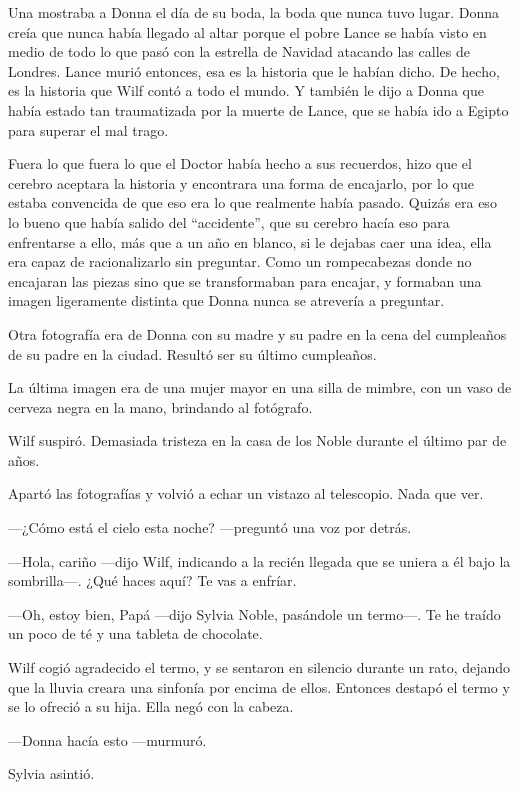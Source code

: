 Una mostraba a Donna el día de su boda, la boda que nunca tuvo lugar.
Donna creía que nunca había llegado al altar porque el pobre Lance se
había visto en medio de todo lo que pasó con la estrella de Navidad
atacando las calles de Londres. Lance murió entonces, esa es la historia
que le habían dicho. De hecho, es la historia que Wilf contó a todo el
mundo. Y también le dijo a Donna que había estado tan traumatizada por
la muerte de Lance, que se había ido a Egipto para superar el mal trago.

Fuera lo que fuera lo que el Doctor había hecho a sus recuerdos, hizo
que el cerebro aceptara la historia y encontrara una forma de encajarlo,
por lo que estaba convencida de que eso era lo que realmente había
pasado. Quizás era eso lo bueno que había salido del ``accidente'', que
su cerebro hacía eso para enfrentarse a ello, más que a un año en
blanco, si le dejabas caer una idea, ella era capaz de racionalizarlo
sin preguntar. Como un rompecabezas donde no encajaran las piezas sino
que se transformaban para encajar, y formaban una imagen ligeramente
distinta que Donna nunca se atrevería a preguntar.

Otra fotografía era de Donna con su madre y su padre en la cena del
cumpleaños de su padre en la ciudad. Resultó ser su último cumpleaños.

La última imagen era de una mujer mayor en una silla de mimbre, con un
vaso de cerveza negra en la mano, brindando al fotógrafo.

Wilf suspiró. Demasiada tristeza en la casa de los Noble durante el
último par de años.

Apartó las fotografías y volvió a echar un vistazo al telescopio. Nada
que ver.

---¿Cómo está el cielo esta noche? ---preguntó una voz por detrás.

---Hola, cariño ---dijo Wilf, indicando a la recién llegada que se
uniera a él bajo la sombrilla---. ¿Qué haces aquí? Te vas a enfríar.

---Oh, estoy bien, Papá ---dijo Sylvia Noble, pasándole un termo---. Te
he traído un poco de té y una tableta de chocolate.

Wilf cogió agradecido el termo, y se sentaron en silencio durante un
rato, dejando que la lluvia creara una sinfonía por encima de ellos.
Entonces destapó el termo y se lo ofreció a su hija. Ella negó con la
cabeza.

---Donna hacía esto ---murmuró.

Sylvia asintió.

